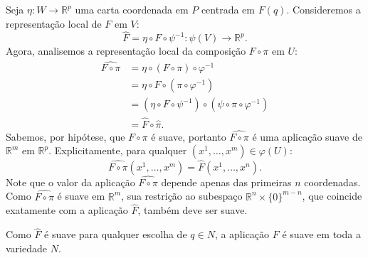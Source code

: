 {	Seja $\eta: W \to \mathbb{R}^p$ uma carta coordenada em $P$ centrada em $F(q)$. Consideremos a representação local de $F$ em $V$:
	\begin{equation*}
		\hat{F} = \eta \circ F \circ \psi^{-1} : \psi(V) \to \mathbb{R}^p.
	\end{equation*}
	Agora, analisemos a representação local da composição $F \circ \pi$ em $U$:
	\begin{align*}
		\widehat{F \circ \pi} &= \eta \circ (F \circ \pi) \circ \varphi^{-1} \\
		&= \eta \circ F \circ (\pi \circ \varphi^{-1}) \\
		&= (\eta \circ F \circ \psi^{-1}) \circ (\psi \circ \pi \circ \varphi^{-1}) \\
		&= \hat{F} \circ \hat{\pi}.
	\end{align*}
	Sabemos, por hipótese, que $F \circ \pi$ é suave, portanto $\widehat{F \circ \pi}$ é uma aplicação suave de $\mathbb{R}^m$ em $\mathbb{R}^p$. Explicitamente, para qualquer $(x^1, \dots, x^m) \in \varphi(U)$:
	\begin{equation*}
		\widehat{F \circ \pi}(x^1, \dots, x^m) = \hat{F}(x^1, \dots, x^n).
	\end{equation*}
	Note que o valor da aplicação $\widehat{F \circ \pi}$ depende apenas das primeiras $n$ coordenadas. Como $\widehat{F \circ \pi}$ é suave em $\mathbb{R}^m$, sua restrição ao subespaço $\mathbb{R}^n \times \{0\}^{m-n}$, que coincide exatamente com a aplicação $\hat{F}$, também deve ser suave.
	
	Como $\hat{F}$ é suave para qualquer escolha de $q \in N$, a aplicação $F$ é suave em toda a variedade $N$.
}


